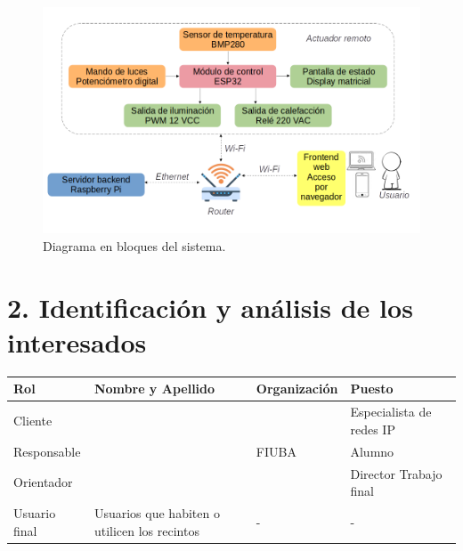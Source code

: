 \documentclass[
11pt, %
]{charter}
\begin{document}
\begin{figure}[htpb]
\centering 
\includegraphics[width=1\textwidth]{./Figuras/Diagrama-bloques.png}
\caption{Diagrama en bloques del sistema.}
\label{fig:diagBloques}
\end{figure}

\vspace{25px}

\section{2. Identificación y análisis de los interesados}
\label{sec:interesados}

\begin{table}[ht]
\begin{tabularx}{\linewidth}{@{}|l|X|X|l|@{}}
\hline
\rowcolor[HTML]{C0C0C0} 
Rol				& Nombre y Apellido	& Organización		& Puesto 	\\ \hline
Cliente			& \clientename		&\empclientename		& Especialista de redes IP 	\\ \hline
Responsable		& \authorname		& FIUBA				& Alumno 	\\ \hline
Orientador		& \supname			& \pertesupname		& Director Trabajo final \\ \hline
Usuario final	& Usuarios que habiten o utilicen los recintos	& -		& -       	\\ \hline
\end{tabularx}
\end{table}
\end{document}
